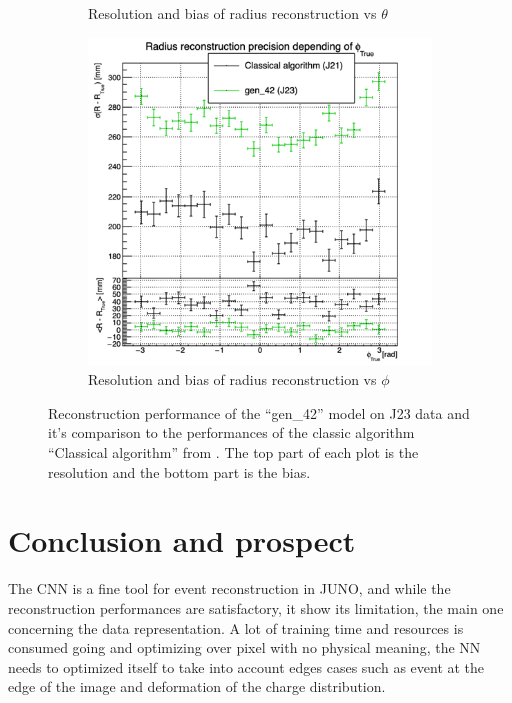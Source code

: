 \documentclass[../main.tex]{subfiles}
\begin{document}
\begin{figure}[ht]
\begin{subfigure}[t]{0.32\linewidth}
    \caption{Resolution and bias of radius reconstruction vs $\theta$}
    \label{fig:jcnn:vic_cnn:multi_vic_42_MSBvTTC}
  \end{subfigure}
  \begin{subfigure}[t]{0.32\linewidth}
    \centering
    \includegraphics[width=\linewidth]{images/jcnn/vic_cnn/multi_vic_42_MSBvPTC.png}
    \caption{Resolution and bias of radius reconstruction vs $\phi$}
    \label{fig:jcnn:vic_cnn:multi_vic_42_MSBvPTC}
  \end{subfigure}
  \caption{Reconstruction performance of the ``gen\_42'' model on J23 data and it's comparison to the performances of the classic algorithm ``Classical algorithm'' from \cite{lebrin_towards_2022}. The top part of each plot is the resolution and the bottom part is the bias.}
  \label{fig:jcnn:vic_cnn:gen42}
\end{figure}

\section{Conclusion and prospect}
\label{sec:jcnn:prospect}

The CNN is a fine tool for event reconstruction in JUNO, and while the reconstruction performances are satisfactory, it show its limitation, the main one concerning the data representation. A lot of training time and resources is consumed going and optimizing over pixel with no physical meaning, the NN needs to optimized itself to take into account edges cases such as event at the edge of the image and deformation of the charge distribution.
\end{document}
